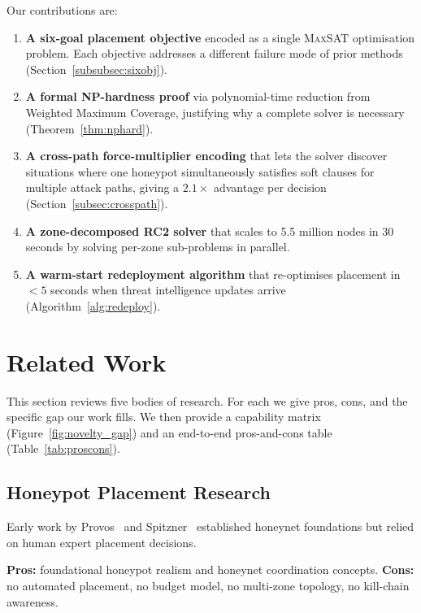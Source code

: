 \documentclass[journal]{IEEEtran}
\newcommand{\maxsat}{\textsc{MaxSAT}}
\begin{document}
Our contributions are:
\begin{enumerate}
\item \textbf{A six-goal placement objective} encoded as a
single \maxsat{} optimisation problem.
Each objective addresses a different failure mode of prior
methods (Section~\ref{subsubsec:sixobj}).

\item \textbf{A formal NP-hardness proof} via polynomial-time
reduction from Weighted Maximum Coverage, justifying why a
complete solver is necessary (Theorem~\ref{thm:nphard}).

\item \textbf{A cross-path force-multiplier encoding} that
lets the solver discover situations where one honeypot
simultaneously satisfies soft clauses for multiple attack
paths, giving a $2.1\times$ advantage per decision
(Section~\ref{subsec:crosspath}).

\item \textbf{A zone-decomposed RC2 solver} that scales to
5.5 million nodes in 30 seconds by solving per-zone
sub-problems in parallel.

\item \textbf{A warm-start redeployment algorithm} that
re-optimises placement in $<5$ seconds when threat
intelligence updates arrive (Algorithm~\ref{alg:redeploy}).
\end{enumerate}

\section{Related Work}
\label{sec:related}

This section reviews five bodies of research.
For each we give pros, cons, and the specific gap our work
fills.
We then provide a capability matrix
(Figure~\ref{fig:novelty_gap}) and an end-to-end
pros-and-cons table (Table~\ref{tab:proscons}).

\subsection{Honeypot Placement Research}

Early work by Provos~\cite{provos2004} and
Spitzner~\cite{spitzner2003} established honeynet
foundations but relied on human expert placement decisions.

\textbf{Pros:} foundational honeypot realism and honeynet
coordination concepts.
\textbf{Cons:} no automated placement, no budget model, no
multi-zone topology, no kill-chain awareness.
\end{document}
